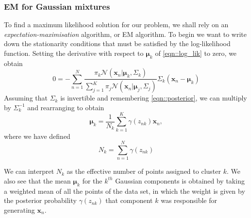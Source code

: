 \documentclass[a4paper]{article}
\begin{document}
 	\subsubsection{EM for Gaussian mixtures}
 	To find a maximum likelihood solution for our problem, we shall rely on an \textit{expectation-maximisation} algorithm, or EM algorithm.
 	To begin we want to write down the stationarity conditions that must be satisfied by the log-likelihood function.
 	Setting the derivative with respect to $\boldsymbol{\mu}_{k}$ of \eqref{eqn::log_lik} to zero, we obtain
 	\begin{equation*}
 	0 = - \sum_{n=1}^{N} \frac{\pi_{k}\mathcal{N}\left( \boldsymbol{x}_{n} | \boldsymbol{\mu}_{k}, \Sigma_{k} \right)}{\sum_{j=1}^{K} \pi_{j}\mathcal{N}\left( \boldsymbol{x}_{n} | \boldsymbol{\mu}_{j}, \Sigma_{j} \right)} \Sigma_{k} \left( \boldsymbol{x}_{n} - \boldsymbol{\mu}_{k} \right)
 	\end{equation*}
 	Assuming that $\Sigma_{k}$ is invertible and remembering \eqref{eqn::posterior}, we can multiply by $\Sigma_{k}^{-1}$ and rearranging to obtain
 	\begin{equation*}
 	\boldsymbol{\mu}_{k} = \frac{1}{N_{k}} \sum_{k=1}^{K} \gamma \left( z_{nk} \right) \boldsymbol{x}_{n},
 	\end{equation*}
 	where we have defined 
 	\begin{equation*}
 	N_{k} = \sum_{n=1}^{N} \gamma \left( z_{nk} \right)
 	\end{equation*}
 	
 	We can interpret $N_{k}$ as the effective number of points assigned to cluster $k$. We also see that the mean $\boldsymbol{\mu}_{k}$ for the $k^{th}$ Gaussian components is obtained by taking a weighted mean of all the points of the data set, in which the weight is given by the posterior probability $\gamma \left( z_{nk} \right)$ that component $k$ was responsible for generating $\boldsymbol{x}_{n}$.
 	
\end{document}

